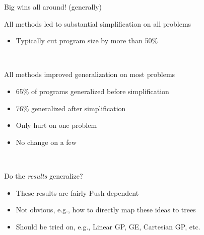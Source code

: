 \documentclass{beamer}
\begin{document}
\begin{frame}{Big wins all around! (generally)}

All methods led to substantial simplification on all problems
\begin{itemize}
	\item Typically cut program size by more than 50\%
\end{itemize}

~

All methods improved generalization on most problems
\begin{itemize}
	\item 65\% of programs generalized before simplification
	\item 76\% generalized after simplification
	\item Only hurt on one problem
	\item No change on a few
\end{itemize}

~

Do the \emph{results} generalize?
\begin{itemize}
	\item These results are fairly Push dependent
	\item Not obvious, e.g., how to directly map these ideas to trees
	\item Should be tried on, e.g., Linear GP, GE, Cartesian GP, etc.
\end{itemize}


\end{frame}
\end{document}

